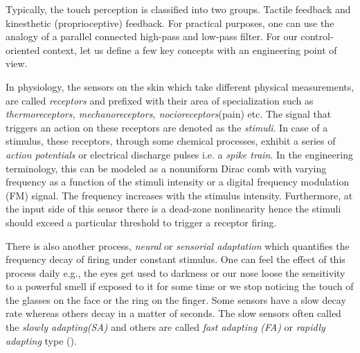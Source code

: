 Typically, the touch perception is classified into two groups. Tactile feedback and kinesthetic (proprioceptive) feedback. For practical purposes, one can use the analogy of a parallel connected high-pass and low-pass filter. For our control-oriented context, let us define a few key concepts with an engineering point of view. 

In physiology, the sensors on the skin which take different physical measurements, are called \emph{receptors} and prefixed with their area of specialization such as \emph{thermoreceptors, mechanoreceptors, nocioreceptors}(pain) etc. The signal that triggers an action on these receptors are denoted as the \emph{stimuli}. In case of a stimulus, these receptors, through some chemical processes, exhibit a series of \emph{action potentials} or electrical discharge pulses i.e. a \emph{spike train}. In the engineering terminology, this can be modeled as a nonuniform Dirac comb with varying frequency as a function of the stimuli intensity or a digital frequency modulation (FM) signal. The frequency increases with the stimulus intensity. Furthermore, at the input side of this sensor there is a dead-zone nonlinearity hence the stimuli should exceed a particular threshold to trigger a receptor firing.

There is also another process, \emph{neural} or \emph{sensorial adaptation} which quantifies the frequency decay of firing under constant stimulus. One can feel the effect of this process daily e.g., the eyes get used to darkness or our nose loose the sensitivity to a powerful smell if exposed to it for some time or we stop noticing the touch of the glasses on the face or the ring on the finger. Some sensors have a slow decay rate whereas others decay in a matter of seconds. The slow sensors often called the \emph{slowly adapting(SA)} and others are called \emph{fast adapting (FA)} or \emph{rapidly adapting} type (\cite{burdea}).


